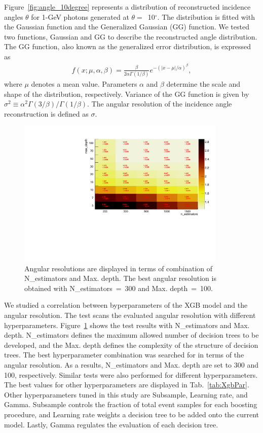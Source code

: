 \documentclass[preprint,12pt,times,a4paper]{elsarticle}
\begin{document}
Figure~\ref{fig:angle_10degree} represents a distribution of reconstructed incidence angles $\theta$ for 1-GeV photons generated at $\theta=$~10$^{\circ}$. The distribution is fitted with the Gaussian function and the Generalized Gaussian (GG) function. We tested two functions, Gaussian and GG to describe the reconstructed angle distribution. The GG function, also known as the generalized error distribution, is expressed as
\begin{eqnarray} 
f(x; \mu, \alpha, \beta) = \frac{\beta}{2 \alpha \Gamma(1/\beta)}e^{-(|x-\mu|/\alpha)^\beta},
\label{eqn:gg}
\end{eqnarray}
where $\mu$ denotes a mean value. Parameters $\alpha$ and $\beta$ determine the scale and shape of the distribution, respectively. Variance of the GG function is given by $\sigma^2 \equiv \alpha^2 \Gamma(3/\beta) / \Gamma(1/\beta)$. The angular resolution of the incidence angle reconstruction is defined as $\sigma$.

\begin{figure}[!hbt]
\includegraphics[width=0.89\textwidth]{figures/Fig4_Opt.pdf}
\caption{Angular resolutions are displayed in terms of combination of N\_estimators and Max. depth. The best angular resolution is obtained with N\_estimators~=~300 and Max. depth~=~100. }
\label{fig:par_scan}
\end{figure}

We studied a correlation between byperparameters of the XGB model and the angular resolution. The test scans the evaluated angular resolution with different hyperparameters. Figure~\ref{fig:par_scan} shows the test results with N\_estimators and Max. depth. N\_estimators defines the maximum allowed number of decision trees to be developed, and the Max. depth defines the complexity of the structure of decision trees. The best hyperparameter combination was searched for in terms of the angular resolution. As a results, N\_estimators and Max. depth are set to 300 and 100, respectively. Similar tests were also performed for different hyperparameters. The best values for other hyperparameters are displayed in Tab.~\ref{tab:XgbPar}. Other hyperparameters tuned in this study are Subsample, Learning rate, and Gamma. Subsample controls the fraction of total event samples for each boosting procedure, and Learning rate weights a decision tree to be added onto the current model. Lastly, Gamma regulates the evaluation of each decision tree.
\end{document}
